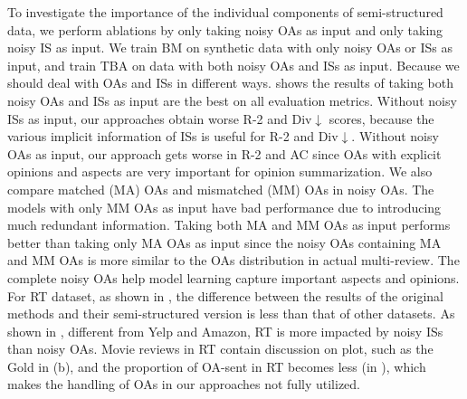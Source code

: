 To investigate the importance of the individual components of semi-structured data, we perform ablations 
by only taking noisy OAs as input and only taking noisy IS as input.
We train BM on synthetic data with only noisy OAs or ISs as input,
and train TBA on data with both noisy OAs and ISs as input. 
Because we should deal with OAs and ISs in different ways. 
 shows the results of taking both noisy OAs and ISs as input are the best on all evaluation metrics. 
Without noisy ISs as input, 
our approaches obtain worse R-2 and Div$\downarrow$ scores,
because the various implicit information of ISs is useful for R-2 and Div$\downarrow$.
Without noisy OAs as input, our approach gets worse in R-2 and AC  since OAs with explicit opinions and aspects are very important for opinion summarization.
We also compare matched (MA) OAs and mismatched (MM) OAs in noisy OAs.
The models with only MM OAs as input have bad performance
due to introducing much redundant information.
Taking both MA and MM OAs as input performs better than taking only MA OAs as input
since the noisy OAs containing MA and MM OAs is more similar to the OAs distribution in actual multi-review.
The complete noisy OAs help model learning capture important aspects and opinions.%
For RT dataset, as shown in , 
the difference between the results of the original methods and their semi-structured version is less than that of other datasets. 
As shown in , different from Yelp and Amazon,
RT is more impacted by noisy ISs than noisy OAs.
Movie reviews in RT contain discussion on plot, such as the Gold in (b),
and the proportion of OA-sent in RT becomes less (in  ), 
which makes the handling of OAs in our approaches not fully utilized.
